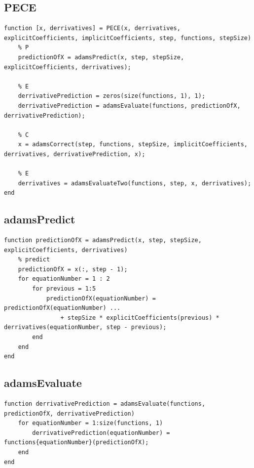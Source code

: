 \subsection{PECE}
\begin{simplechar}
\begin{lstlisting}
function [x, derrivatives] = PECE(x, derrivatives, explicitCoefficients, implicitCoefficients, step, functions, stepSize)
    % P
    predictionOfX = adamsPredict(x, step, stepSize, explicitCoefficients, derrivatives);

    % E
    derrivativePrediction = zeros(size(functions, 1), 1);
    derrivativePrediction = adamsEvaluate(functions, predictionOfX, derrivativePrediction);

    % C
    x = adamsCorrect(step, functions, stepSize, implicitCoefficients, derrivatives, derrivativePrediction, x);

    % E
    derrivatives = adamsEvaluateTwo(functions, step, x, derrivatives);
end
\end{lstlisting}
\end{simplechar}

\subsection{adamsPredict}
\begin{simplechar}
\begin{lstlisting}
function predictionOfX = adamsPredict(x, step, stepSize, explicitCoefficients, derrivatives)
    % predict
    predictionOfX = x(:, step - 1);
    for equationNumber = 1 : 2
        for previous = 1:5
            predictionOfX(equationNumber) = predictionOfX(equationNumber) ...
                + stepSize * explicitCoefficients(previous) * derrivatives(equationNumber, step - previous);
        end
    end
end
\end{lstlisting}
\end{simplechar}

\subsection{adamsEvaluate}
\begin{simplechar}
\begin{lstlisting}
function derrivativePrediction = adamsEvaluate(functions, predictionOfX, derrivativePrediction)
    for equationNumber = 1:size(functions, 1)
        derrivativePrediction(equationNumber) = functions{equationNumber}(predictionOfX);
    end
end
\end{lstlisting}
\end{simplechar}

